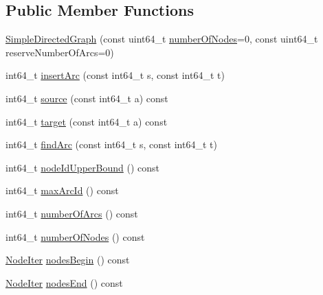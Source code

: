 \subsection*{Public Member Functions}
\begin{DoxyCompactItemize}
\item 
\hyperlink{classnifty_1_1graph_1_1SimpleDirectedGraph_a81190fff5233f90e9fb5cbb29fc46bda}{Simple\+Directed\+Graph} (const uint64\+\_\+t \hyperlink{classnifty_1_1graph_1_1SimpleDirectedGraph_ae580fbf9a2c3c43bbb83ecda9251a66b}{number\+Of\+Nodes}=0, const uint64\+\_\+t reserve\+Number\+Of\+Arcs=0)
\item 
int64\+\_\+t \hyperlink{classnifty_1_1graph_1_1SimpleDirectedGraph_aec4eeda3468d8678b1ccab285b9cb9e5}{insert\+Arc} (const int64\+\_\+t s, const int64\+\_\+t t)
\item 
int64\+\_\+t \hyperlink{classnifty_1_1graph_1_1SimpleDirectedGraph_a980e5c67c4179e8f5c60f1f7f02edbd3}{source} (const int64\+\_\+t a) const
\item 
int64\+\_\+t \hyperlink{classnifty_1_1graph_1_1SimpleDirectedGraph_a4e637849a581e2f83eed9a2af72f75ad}{target} (const int64\+\_\+t a) const
\item 
int64\+\_\+t \hyperlink{classnifty_1_1graph_1_1SimpleDirectedGraph_aad6e2efc56adee1f93dcb7a7c1528851}{find\+Arc} (const int64\+\_\+t s, const int64\+\_\+t t)
\item 
int64\+\_\+t \hyperlink{classnifty_1_1graph_1_1SimpleDirectedGraph_a7e0b89fa4e9a03314548867a765621f2}{node\+Id\+Upper\+Bound} () const
\item 
int64\+\_\+t \hyperlink{classnifty_1_1graph_1_1SimpleDirectedGraph_a6ce4bb56c6f27bec7d1cbb2ba7f4ab46}{max\+Arc\+Id} () const
\item 
int64\+\_\+t \hyperlink{classnifty_1_1graph_1_1SimpleDirectedGraph_a94e69d068fb6c150939838639120482c}{number\+Of\+Arcs} () const
\item 
int64\+\_\+t \hyperlink{classnifty_1_1graph_1_1SimpleDirectedGraph_ae580fbf9a2c3c43bbb83ecda9251a66b}{number\+Of\+Nodes} () const
\item 
\hyperlink{classnifty_1_1graph_1_1SimpleDirectedGraph_a50b05474da6846da32398e01be9e3d30}{Node\+Iter} \hyperlink{classnifty_1_1graph_1_1SimpleDirectedGraph_aa4cd2db000b40a4f4c2b9713f602c772}{nodes\+Begin} () const
\item 
\hyperlink{classnifty_1_1graph_1_1SimpleDirectedGraph_a50b05474da6846da32398e01be9e3d30}{Node\+Iter} \hyperlink{classnifty_1_1graph_1_1SimpleDirectedGraph_a87f8944d79ef5c0098f3f14e0e47046f}{nodes\+End} () const

\end{DoxyCompactItemize}
